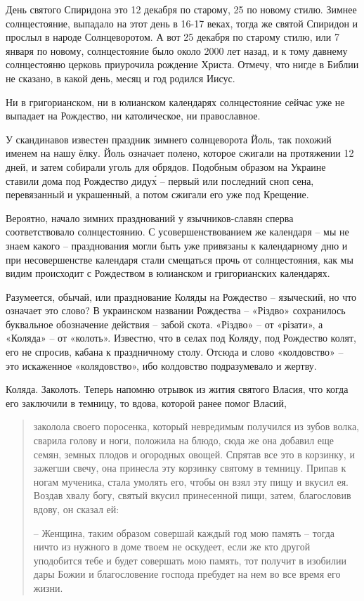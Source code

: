    День святого Спиридона это 12 декабря по старому, 25 по новому стилю. Зимнее солнцестояние, выпадало на этот день в 16-17 веках, тогда же святой Спиридон и прослыл в народе Солнцеворотом. А вот 25 декабря по старому стилю, или 7 января по новому, солнцестояние было около 2000 лет назад, и к тому давнему солнцестояню церковь приурочила рождение Христа. Отмечу, что нигде в Библии не сказано, в какой день, месяц и год родился Иисус.

   Ни в григорианском, ни в юлианском календарях солнцестояние сейчас уже не выпадает на Рождество, ни католическое, ни православное.

   У скандинавов известен праздник зимнего солнцеворота Йоль, так похожий именем на нашу ёлку. Йоль означает полено, которое сжигали на протяжении 12 дней, и затем собирали уголь для обрядов. Подобным образом на Украине ставили дома под Рождество диду\'х – первый или последний сноп сена, перевязанный и украшенный, а потом сжигали его уже под Крещение.

   Вероятно, начало зимних празднований у язычников-славян сперва соответствовало  солнцестоянию. С усовершенствованием же календаря – мы не знаем какого – празднования могли быть уже привязаны к календарному дню и при несовершенстве календаря стали смещаться прочь от солнцестояния, как мы видим происходит с Рождеством в юлианском и григорианских календарях.

   Разумеется, обычай, или празднование Коляды на Рождество – языческий, но что означает это слово? В украинском названии
Рождества – «Різдво» сохранилось буквальное обозначение действия – забой скота. «Різдво» – от «різати», а «Коляда» – от «колоть». Известно, что в селах под Коляду, под Рождество колят, его не спросив, кабана к праздничному столу. Отсюда и слово «колдовство» – это искаженное «колядовство», ибо колдовство подразумевало и жертву.

   Коляда. Заколоть. Теперь напомню отрывок из жития святого Власия, что когда его заключили в темницу, то вдова, которой ранее помог Власий,

\begin{quotation}
заколола своего поросенка, который невредимым получился из зубов волка, сварила голову и ноги, положила на блюдо, сюда же она добавил еще семян, земных плодов и огородных овощей. Спрятав все это в корзинку, и зажегши свечу, она принесла эту корзинку святому в темницу. Припав к ногам мученика, стала умолять его, чтобы он взял эту пищу и вкусил ея. Воздав хвалу богу, святый вкусил принесенной пищи, затем, благословив вдову, он сказал ей:

 – Женщина, таким образом совершай каждый год мою память – тогда ничто из нужного в доме твоем не оскудеет, если же кто другой уподобится тебе и будет совершать мою память, тот получит в изобилии дары Божии и благословение господа пребудет на нем во все время его жизни.
\end{quotation}

